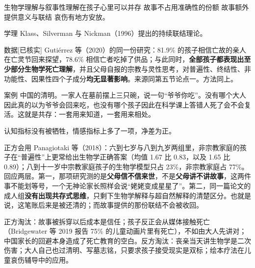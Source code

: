 \documentclass[prep,both]{debate}
\begin{document}
\begin{fields}
\begin{mechanism}[机制]
\step 生物学理解与叙事性理解在孩子心里可以并存
\step 故事不占用准确性的份额
\step 故事额外提供意义与联结
\step 哀伤有地方安放。

\end{mechanism}
\begin{evidence}{学理}
Klass、Silverman 与 Nickman（1996）提出的持续联结理论。
\end{evidence}
\begin{evidence}{数据}[已核实]
Gutiérrez 等（2020）的同一份研究：81.9\% 的孩子相信亡故的亲人在亡灵节回来探望，78.6\% 相信亡者吃掉了供品；与此同时，\textbf{全部孩子都表现出至少部分生物学死亡理解}，并且父母自报的宗教与灵性思考，对普遍性、终结性、非功能性、因果性四个子成分\textbf{均无显著影响}。来源同第五节论点一。方法同上。
\end{evidence}
\begin{evidence}{案例}
中国的清明。一家人在墓前摆上三只碗，说一句“爷爷你吃”。没有哪个大人因此真的以为爷爷会回来吃，也没有哪个孩子因此在科学课上答错人死了会不会复活。这就是共存：一套用来知道，一套用来相处。
\end{evidence}
\closing[回扣判准]{认知指标没有被牺牲，情感指标上多了一项，净差为正。}
\begin{clash}
正方会用 Panagiotaki 等（2018）：六到七岁与八到九岁两组里，非宗教家庭的孩子在“普遍性”上更常给出生物学正确答案（均值 1.67 比 0.83，以及 1.65 比 0.89）；八到十一岁中宗教家庭孩子的生物学模型只占 23\%，非宗教家庭占 77\%。回应两层。第一，那项研究测的是\textbf{父母信不信来世}，不是\textbf{父母讲不讲故事}，这两件事不能划等号，一个无神论家长照样会说“姥姥变成星星了”。第二，同一篇论文的成人组\textbf{没有出现共存式思维}，只剩下生物学解释与超自然解释的清楚区分。也就是说，这笔账后来是被还清的；而故事提供的那份联结不会被收回。
\end{clash}
\end{fields}
正方淘汰：故事被拆穿以后成本是信任；孩子反正会从媒体接触死亡（Bridgewater 等 2019 报告 75\% 的儿童动画片里有死亡），不如由大人先讲对；中国家长的回避本身造成了死亡教育的空白。反方淘汰：丧亲当天讲生物学是二次伤害；大人自己也过清明、写墓志铭，只要求孩子接受现实是双标；绘本疗法在儿童哀伤辅导中的应用。
\end{document}

